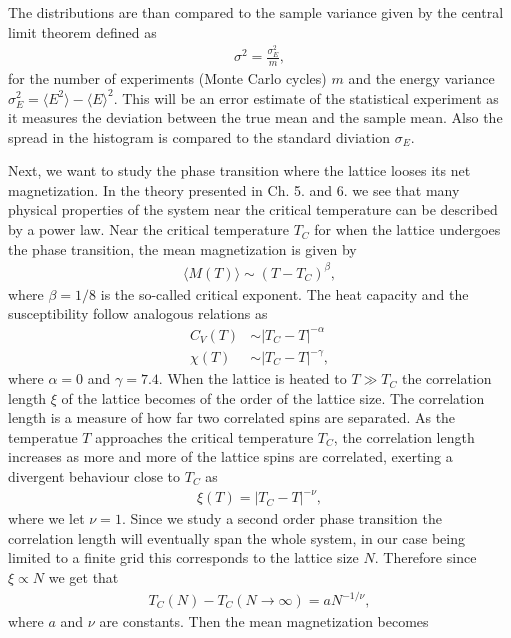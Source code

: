 \documentclass[twocolumn]{aastex62}
\begin{document}
The distributions are than compared to the sample variance given by the central
limit theorem \citep[p. 357]{jensen:2015} defined as
\begin{align}
	\sigma^2 = \frac{\sigma^2_E}{m},
\end{align}
for the number of experiments (Monte Carlo cycles) $m$ and the energy variance
$\sigma_E^2 = \langle E^2\rangle - \langle E \rangle^2$. This will be an error
estimate of the statistical experiment as it measures the deviation between the
true mean and the sample mean. Also the spread in the histogram is compared to
the standard diviation $\sigma_E$.

Next, we want to study the phase transition where the lattice looses its net
magnetization. In the theory presented in Ch. 5. and 6. \cite{plischke:2006} we see that many
physical properties of the system near the
critical temperature can be described by a power law. Near the critical temperature
$T_C$ for when the lattice undergoes the phase transition, the mean magnetization is
given by
\begin{align}
	\langle M(T) \rangle \sim (T-T_C)^\beta,
\end{align}
where $\beta = 1/8$ is the so-called critical exponent. The heat capacity and
the susceptibility follow analogous relations as
\begin{align}
	C_V(T) &\sim |T_C - T|^{-\alpha} \\
	\chi(T) &\sim |T_C - T|^{-\gamma},
\end{align}
where $\alpha = 0$ and $\gamma = 7.4$. When the lattice is heated to $T \gg T_C$
the correlation length $\xi$ of the lattice becomes of the order of the lattice size.
The correlation length is a measure of how far two correlated spins are
separated. As the temperatue $T$ approaches the critical temperature $T_C$, the
correlation length increases as more and more of the lattice spins are correlated, exerting a divergent behaviour close to $T_C$ as
\begin{align}
	\xi(T) = |T_C - T|^{-\nu},
\end{align}
where we let $\nu = 1$. Since we study a second order phase transition the
correlation length will eventually span the whole system, in our case being
limited to a finite grid this corresponds to the
lattice size $N$. Therefore since
$\xi\propto N$ we get that
\begin{align}
	T_C(N) - T_C(N\to\infty) = aN^{-1/\nu},
	\label{eq:temp_crit}
\end{align}
where $a$ and $\nu$ are constants. Then the mean magnetization becomes 
\end{document}
